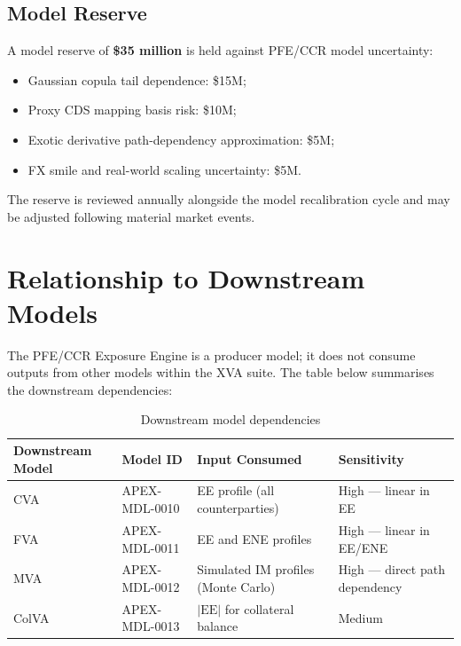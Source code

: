 \documentclass[11pt,a4paper]{article}
\begin{document}
\subsection{Model Reserve}

A model reserve of \textbf{\$35 million} is held against PFE/CCR model
uncertainty:

\begin{itemize}[noitemsep]
  \item Gaussian copula tail dependence: \$15M;
  \item Proxy CDS mapping basis risk: \$10M;
  \item Exotic derivative path-dependency approximation: \$5M;
  \item FX smile and real-world scaling uncertainty: \$5M.
\end{itemize}

The reserve is reviewed annually alongside the model recalibration cycle and
may be adjusted following material market events.

\section{Relationship to Downstream Models}

The PFE/CCR Exposure Engine is a producer model; it does not consume outputs
from other models within the XVA suite. The table below summarises the
downstream dependencies:

\begin{table}[h!]
\centering
\begin{tabular}{@{}llll@{}}
\toprule
\textbf{Downstream Model} & \textbf{Model ID} & \textbf{Input Consumed} & \textbf{Sensitivity} \\
\midrule
CVA  & APEX-MDL-0010 & EE profile (all counterparties)        & High --- linear in EE \\
FVA  & APEX-MDL-0011 & EE and ENE profiles                    & High --- linear in EE/ENE \\
MVA  & APEX-MDL-0012 & Simulated IM profiles (Monte Carlo)    & High --- direct path dependency \\
ColVA & APEX-MDL-0013 & $|\text{EE}|$ for collateral balance  & Medium \\
\bottomrule
\end{tabular}
\caption{Downstream model dependencies}
\end{table}
\end{document}
